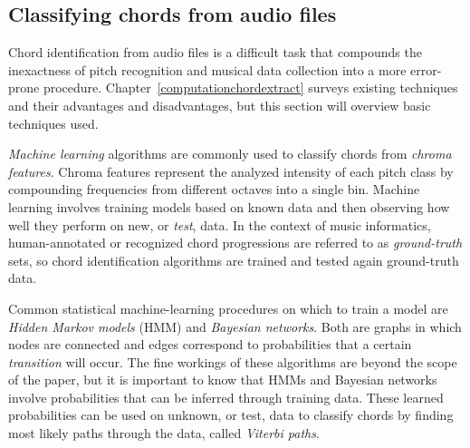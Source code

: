 \subsection{Classifying chords from audio files}

Chord identification from audio files is a difficult task that compounds the inexactness of pitch recognition and musical data collection into a more error-prone procedure. Chapter~\ref{computationchordextract} surveys existing techniques and their advantages and disadvantages, but this section will overview basic techniques used.

\textit{Machine learning} algorithms are commonly used to classify chords from \textit{chroma features}. Chroma features represent the analyzed intensity of each pitch class by compounding frequencies from different octaves into a single bin. Machine learning involves training models based on known data and then observing how well they perform on new, or \textit{test}, data. In the context of music informatics, human-annotated or recognized chord progressions are referred to as \textit{ground-truth} sets\cite{BurgoyneEtAl_2011_AnExpeGrouSet}, so chord identification algorithms are trained and tested again ground-truth data.

Common statistical machine-learning procedures on which to train a model are \textit{Hidden Markov models} (HMM) and \textit{Bayesian networks}. Both are graphs in which nodes are connected and edges correspond to probabilities that a certain \textit{transition} will occur. The fine workings of these algorithms are beyond the scope of the paper, but it is important to know that HMMs and Bayesian networks involve probabilities that can be inferred through training data. These learned probabilities can be used on unknown, or test, data to classify chords by finding most likely paths through the data, called \textit{Viterbi paths}.